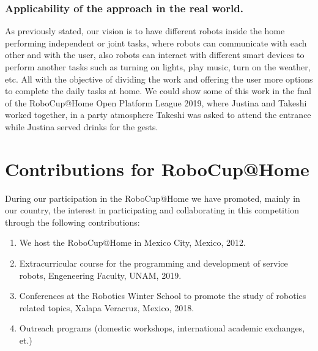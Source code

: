 \documentclass{llncs}
\begin{document}
\subsubsection{Applicability of the approach in the real world.} 

As previously stated, 
our vision is to have different robots inside the home performing independent or joint tasks, 
where robots can communicate with each other and with the user, 
 also robots can interact with different smart devices to perform another tasks such as turning on lights, play music, turn on the weather, etc.
All with the objective of dividing the work and offering the user more options to complete the daily tasks at home.
We could show some of this work in the fnal of the RoboCup@Home Open Platform League 2019, where Justina and Takeshi worked together, 
in a party atmosphere 
Takeshi was asked to attend the entrance while Justina served drinks for the gests.



\section{Contributions for RoboCup@Home}\label{sec:contributions}
During our participation in the RoboCup@Home we have promoted, mainly in our country, 
the interest in participating and collaborating in this competition through the following contributions:

\begin{enumerate}
	\item We host the RoboCup@Home in Mexico City, Mexico, 2012.\\
	\item Extracurricular course for the programming and development of service robots, Engeneering Faculty, UNAM, 2019.\\
	\item Conferences at the Robotics Winter School to promote the study of robotics related topics, Xalapa Veracruz, Mexico, 2018.\\
	\item Outreach programs (domestic workshops, international academic exchanges, et.) 
\end{enumerate}



\end{document}
